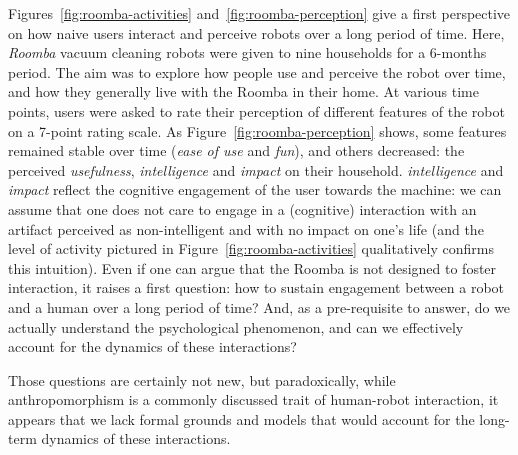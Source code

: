 \documentclass{frontiersSCNS} %
\begin{document}
Figures~\ref{fig:roomba-activities} and~\ref{fig:roomba-perception} give a first
perspective on how naive users interact and perceive robots over a long period
of time. Here, \emph{Roomba} vacuum cleaning robots were given to nine
households for a 6-months period. The aim was to explore how people use and
perceive the robot over time, and how they generally live with the Roomba in
their home. At various time points, users were asked to rate their perception of
different features of the robot on a 7-point rating scale. As
Figure~\ref{fig:roomba-perception} shows, some features remained stable over
time (\emph{ease of use} and \emph{fun}), and others decreased: the perceived
\emph{usefulness}, \emph{intelligence} and \emph{impact} on their household.
\emph{intelligence} and \emph{impact} reflect the cognitive engagement of the
user towards the machine: we can assume that one does not care to engage in a
(cognitive) interaction with an artifact perceived as non-intelligent and with
no impact on one's life (and the level of activity pictured in
Figure~\ref{fig:roomba-activities} qualitatively confirms this intuition). Even
if one can argue that the Roomba is not designed to foster interaction, it
raises a first question: how to sustain engagement between a robot and a human
over a long period of time? And, as a pre-requisite to answer, do we actually
understand the psychological phenomenon, and can we effectively account for the
dynamics of these interactions?

Those questions are certainly not new, but paradoxically, while anthropomorphism
is a commonly discussed trait of human-robot interaction, it appears
that we lack formal grounds and models that would account for the long-term
dynamics of these interactions.
\end{document}
